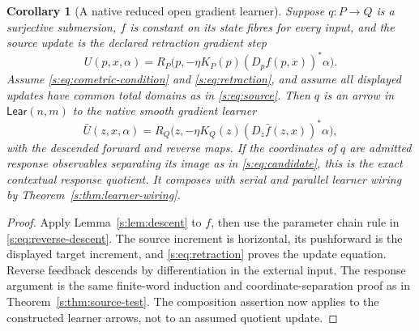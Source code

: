 \documentclass[11pt]{article}
\newtheorem{corollary}[theorem]{Corollary}
\theoremstyle{definition}
\theoremstyle{remark}\newtheorem{remark}[theorem]{Remark}
\newcommand{\Lear}{\mathsf{Lear}}
\begin{document}
\begin{corollary}[A native reduced open gradient learner]
\label{s:cor:native-gradient-learner}
Suppose $q:P\to Q$ is a surjective submersion, $f$ is constant on its
state fibres for every input, and the source update is the declared
retraction gradient step
\[
 U(p,x,\alpha)=R_P\bigl(p,-\eta K_P(p)(D_pf(p,x))^*\alpha\bigr).
\]
Assume \eqref{s:eq:cometric-condition} and \eqref{s:eq:retraction}, and assume
all displayed updates have common total domains as in \eqref{s:eq:source}.
Then $q$ is an arrow in $\Lear(n,m)$ to the native smooth gradient learner
\[
 \bar U(z,x,\alpha)
   =R_Q\bigl(z,-\eta K_Q(z)(D_z\bar f(z,x))^*\alpha\bigr),
\]
with the descended forward and reverse maps. If the coordinates of $q$ are
admitted response observables separating its image as in
\eqref{s:eq:candidate}, this is the exact contextual response quotient.
It composes with serial and parallel learner wiring by
Theorem~\ref{s:thm:learner-wiring}.
\end{corollary}
\begin{proof}
Apply Lemma~\ref{s:lem:descent} to $f$, then use the parameter chain rule in
\eqref{s:eq:reverse-descent}. The source increment is horizontal, its
pushforward is the displayed target increment, and
\eqref{s:eq:retraction} proves the update equation. Reverse feedback descends
by differentiation in the external input. The response argument is the
same finite-word induction and coordinate-separation proof as in
Theorem~\ref{s:thm:source-test}. The composition assertion now applies to the
constructed learner arrows, not to an assumed quotient update.
\end{proof}
\end{document}
